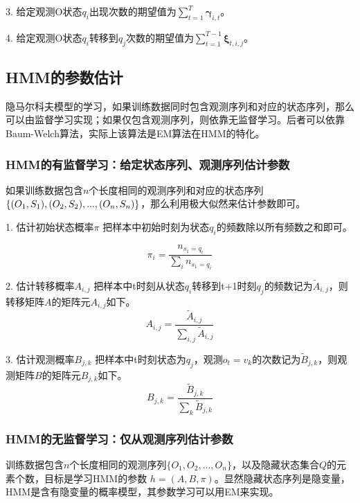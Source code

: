 \documentclass[]{article}
\begin{document}
   3. 给定观测O状态$q_{i}$出现次数的期望值为$\sum_{t=1}^{T}\boldsymbol{\gamma}_{i,t}$。

   4. 给定观测O状态$q_{i}$转移到$q_{j}$次数的期望值为$\sum_{t=1}^{T-1}\boldsymbol{\xi}_{t,i,j}$。


\subsection{HMM的参数估计}
    隐马尔科夫模型的学习，如果训练数据同时包含观测序列和对应的状态序列，那么可以由监督学习实现；如果仅包含观测序列，则依靠无监督学习。后者可以依靠Baum-Welch算法，实际上该算法是EM算法在HMM的特化。
\subsubsection{HMM的有监督学习：给定状态序列、观测序列估计参数}
    如果训练数据包含$n$个长度相同的观测序列和对应的状态序列$\{(O_{1},S_{1}),\\(O_{2},S_{2}),...,(O_{n},S_{n})\}$，那么利用极大似然来估计参数即可。
    
    1. 估计初始状态概率$\pi$
    把样本中初始时刻为状态$q_{i}$的频数除以所有频数之和即可。
    
        \begin{equation}
    	\pi_{i}=\frac{n_{s_{1}=q_{i}}}{\sum_{i}n_{s_{1}=q_{i}}}
    \end{equation} 
    
    2. 估计转移概率$A_{i,j}$
    把样本中t时刻从状态$q_{i}$转移到t+1时刻$q_{j}$的频数记为$\widetilde{A}_{i,j}$，则转移矩阵$A$的矩阵元$A_{i,j}$如下。
    \begin{equation}
    	A_{i,j}=\frac{\widetilde{A}_{i,j}}{\sum_{i,j}\widetilde{A}_{i,j}}
    \end{equation} 
    
    3. 估计观测概率$B_{j,k}$
    把样本中t时刻状态为$q_{j}$，观测$o_{t}=v_{k}$的次数记为$\widetilde{B}_{j,k}$，则观测矩阵$B$的矩阵元$B_{j,k}$如下。
    \begin{equation}
		B_{j,k}=\frac{\widetilde{B}_{j,k}}{\sum_{k}\widetilde{B}_{j,k}}
	\end{equation} 
   
    
\subsubsection{HMM的无监督学习：仅从观测序列估计参数}
	训练数据包含$n$个长度相同的观测序列$\{O_{1},O_{2},...,O_{n}\}$，以及隐藏状态集合$Q$的元素个数，目标是学习HMM的参数
	$h=(A,B,\pi)$。显然隐藏状态序列是隐变量，HMM是含有隐变量的概率模型，其参数学习可以用EM来实现。
	
\end{document}
